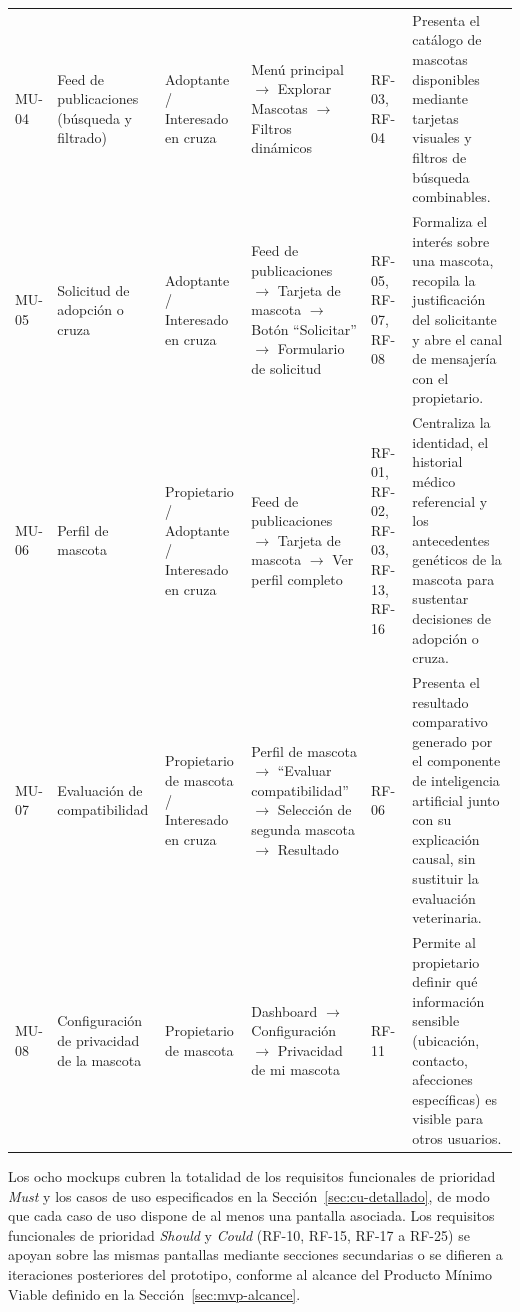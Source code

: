 \documentclass[journal,onecolumn]{IEEEtran}
\begin{document}
{\begin{longtable}{@{}L{1.5cm} L{2.0cm} L{2.3cm} L{3.2cm} L{2.0cm} L{2.9cm}@{}}
			\addlinespace
			MU-04 & Feed de publicaciones (búsqueda y filtrado) & Adoptante / Interesado en cruza & Menú principal $\rightarrow$ Explorar Mascotas $\rightarrow$ Filtros dinámicos & RF-03, RF-04 & Presenta el catálogo de mascotas disponibles mediante tarjetas visuales y filtros de búsqueda combinables. \\
			\addlinespace
			MU-05 & Solicitud de adopción o cruza & Adoptante / Interesado en cruza & Feed de publicaciones $\rightarrow$ Tarjeta de mascota $\rightarrow$ Botón \enquote{Solicitar} $\rightarrow$ Formulario de solicitud & RF-05, RF-07, RF-08 & Formaliza el interés sobre una mascota, recopila la justificación del solicitante y abre el canal de mensajería con el propietario. \\
			\addlinespace
			MU-06 & Perfil de mascota & Propietario / Adoptante / Interesado en cruza & Feed de publicaciones $\rightarrow$ Tarjeta de mascota $\rightarrow$ Ver perfil completo & RF-01, RF-02, RF-03, RF-13, RF-16 & Centraliza la identidad, el historial médico referencial y los antecedentes genéticos de la mascota para sustentar decisiones de adopción o cruza. \\
			\addlinespace
			MU-07 & Evaluación de compatibilidad & Propietario de mascota / Interesado en cruza & Perfil de mascota $\rightarrow$ \enquote{Evaluar compatibilidad} $\rightarrow$ Selección de segunda mascota $\rightarrow$ Resultado & RF-06 & Presenta el resultado comparativo generado por el componente de inteligencia artificial junto con su explicación causal, sin sustituir la evaluación veterinaria. \\
			\addlinespace
			MU-08 & Configuración de privacidad de la mascota & Propietario de mascota & Dashboard $\rightarrow$ Configuración $\rightarrow$ Privacidad de mi mascota & RF-11 & Permite al propietario definir qué información sensible (ubicación, contacto, afecciones específicas) es visible para otros usuarios. \\
		\end{longtable}
	}
	
	Los ocho mockups cubren la totalidad de los requisitos funcionales de
	prioridad \emph{Must} y los casos de uso especificados en la
	Sección~\ref{sec:cu-detallado}, de modo que cada caso de uso dispone de al
	menos una pantalla asociada. Los requisitos funcionales de prioridad
	\emph{Should} y \emph{Could} (RF-10, RF-15, RF-17 a RF-25) se apoyan sobre
	las mismas pantallas mediante secciones secundarias o se difieren a
	iteraciones posteriores del prototipo, conforme al alcance del Producto
	Mínimo Viable definido en la Sección~\ref{sec:mvp-alcance}.
	
\end{document}
